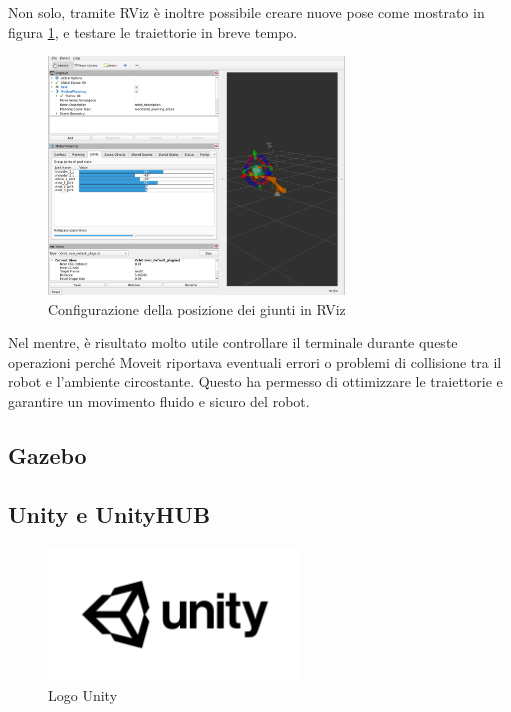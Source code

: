 \documentclass[11pt]{report}
\begin{document}
Non solo, tramite RViz è inoltre possibile creare nuove pose come mostrato in figura \ref{fig:rviz_3}, e testare le traiettorie in breve tempo.

\begin{figure}[H]
    \centering
    \includegraphics[width=0.7\textwidth]{images/rviz_3.PNG}
    \caption{Configurazione della posizione dei giunti in RViz}
    \label{fig:rviz_3}
\end{figure}

Nel mentre, è risultato molto utile controllare il terminale durante queste operazioni perché Moveit riportava eventuali errori o problemi di collisione tra il robot e l'ambiente circostante. Questo ha permesso di ottimizzare le traiettorie e garantire un movimento fluido e sicuro del robot.

\subsection{Gazebo}

\subsection{Unity e UnityHUB}

\begin{figure}[H]
    \centering
    \includegraphics[width=0.6\textwidth]{images/UNITY.jpg}
    \caption{Logo Unity}
    \label{fig:UNITY}
\end{figure}
\end{document}
